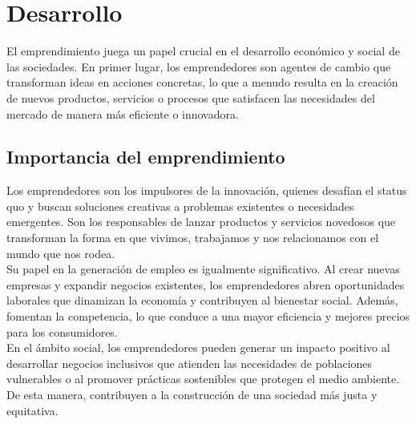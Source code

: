 \documentclass{article}
\begin{document}
\section{Desarrollo}
El emprendimiento juega un papel crucial en el desarrollo económico y social de las sociedades. En primer lugar, los emprendedores son agentes de cambio que transforman ideas en acciones concretas, lo que a menudo resulta en la creación de nuevos productos, servicios o procesos que satisfacen las necesidades del mercado de manera más eficiente o innovadora.
\subsection{Importancia del emprendimiento}
Los emprendedores son los impulsores de la innovación, quienes desafían el status quo y buscan soluciones creativas a problemas existentes o necesidades emergentes. Son los responsables de lanzar productos y servicios novedosos que transforman la forma en que vivimos, trabajamos y nos relacionamos con el mundo que nos rodea.
\vspace{0.5cm}\\
Su papel en la generación de empleo es igualmente significativo. Al crear nuevas empresas y expandir negocios existentes, los emprendedores abren oportunidades laborales que dinamizan la economía y contribuyen al bienestar social. Además, fomentan la competencia, lo que conduce a una mayor eficiencia y mejores precios para los consumidores.
\vspace{0.5cm}\\
En el ámbito social, los emprendedores pueden generar un impacto positivo al desarrollar negocios inclusivos que atienden las necesidades de poblaciones vulnerables o al promover prácticas sostenibles que protegen el medio ambiente. De esta manera, contribuyen a la construcción de una sociedad más justa y equitativa.
\end{document}
